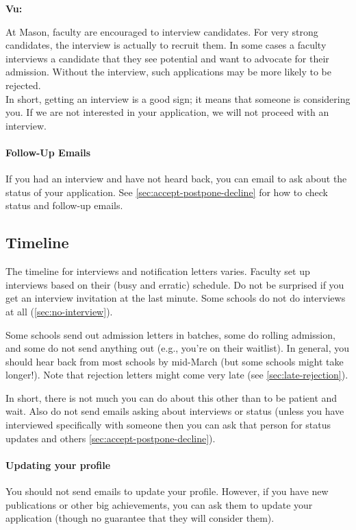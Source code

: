 \documentclass[oneside,11pt,dvipsnames]{book}
\newenvironment{commentbox}[1][]{
  \small
  \begin{mybox}
    {\small \textbf{#1}}
  }{
  \end{mybox}
}
\begin{document}
\begin{commentbox}[Vu:]
  At Mason, faculty are encouraged to interview candidates. For very strong candidates, the interview is actually to recruit them.  In some cases a faculty interviews a candidate that they see potential and want to advocate for their admission. Without the interview, such applications may be more likely to be rejected.\\
  
  In short, getting an interview is a good sign; it means that someone is considering you. If we are not interested in your application, we will not proceed with an interview.
\end{commentbox}

\paragraph{Follow-Up Emails} If you had an interview and have not heard back, you can email to ask about the status of your application. See \autoref{sec:accept-postpone-decline} for how to check status and follow-up emails.

\subsection{Timeline} 

The timeline for interviews and notification letters varies.  Faculty set up interviews based on their (busy and erratic) schedule. Do not be surprised if you get an interview invitation at the last minute. Some schools do not do interviews at all (\autoref{sec:no-interview}).

Some schools send out admission letters in batches, some do rolling admission, and some do not send anything out (e.g., you're on their waitlist).  In general, you should hear back from most schools by mid-March (but some schools might take longer!). Note that rejection letters might come very late (see \autoref{sec:late-rejection}).

In short, there is not much you can do about this other than to be patient and wait. Also do not send emails asking about interviews or status (unless you have interviewed specifically with someone then you can ask that person for status updates and others \autoref{sec:accept-postpone-decline}).

\paragraph{Updating your profile} You should not send emails to update your profile.  However, if you have new publications or other big achievements, you can ask them to update your application (though no guarantee that they will consider them).
\end{document}
